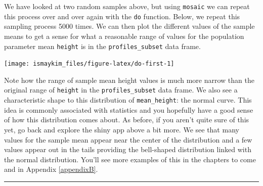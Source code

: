 \documentclass[]{tufte-book}
\newenvironment{Shaded}{\begin{snugshade}}{\end{snugshade}}
\newcommand{\KeywordTok}[1]{\textcolor[rgb]{0.13,0.29,0.53}{\textbf{{#1}}}}
\newcommand{\DataTypeTok}[1]{\textcolor[rgb]{0.13,0.29,0.53}{{#1}}}
\newcommand{\DecValTok}[1]{\textcolor[rgb]{0.00,0.00,0.81}{{#1}}}
\newcommand{\StringTok}[1]{\textcolor[rgb]{0.31,0.60,0.02}{{#1}}}
\newcommand{\OtherTok}[1]{\textcolor[rgb]{0.56,0.35,0.01}{{#1}}}
\newcommand{\NormalTok}[1]{{#1}}
\let\oldrule=\rule
\renewcommand{\rule}[1]{\oldrule{\linewidth}}
\theoremstyle{definition}
\theoremstyle{definition}
\theoremstyle{remark}
\begin{document}
We have looked at two random samples above, but using \texttt{mosaic} we
can repeat this process over and over again with the \texttt{do}
function. Below, we repeat this sampling process 5000 times. We can then
plot the different values of the sample means to get a sense for what a
reasonable range of values for the population parameter mean
\texttt{height} is in the \texttt{profiles\_subset} data frame.

\begin{Shaded}
\end{Shaded}

\begin{center}\texttt{[image: ismaykim\_files/figure-latex/do-first-1]} \end{center}

Note how the range of sample mean height values is much more narrow than
the original range of \texttt{height} in the \texttt{profiles\_subset}
data frame. We also see a characteristic shape to this distribution of
\texttt{mean\_height}: the normal curve. This idea is commonly
associated with statistics and you hopefully have a good sense of how
this distribution comes about. As before, if you aren't quite sure of
this yet, go back and explore the shiny app above a bit more. We see
that many values for the sample mean appear near the center of the
distribution and a few values appear out in the tails providing the
bell-shaped distribution linked with the normal distribution. You'll see
more examples of this in the chapters to come and in Appendix
\ref{appendixB}.

\begin{center}\rule{0.5\linewidth}{\linethickness}\end{center}
\end{document}
